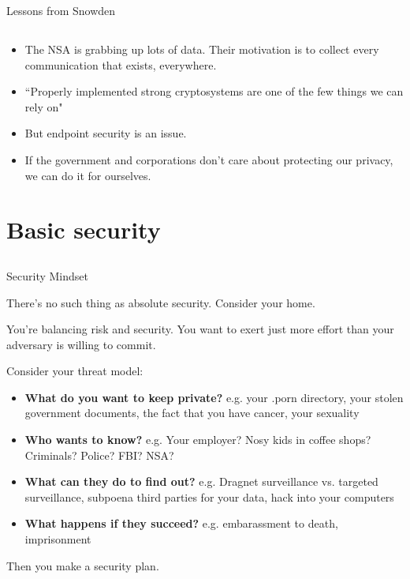 \documentclass{beamer}
\begin{document}
\begin{frame}{Lessons from Snowden}
\subsection{}

\begin{itemize}
   \item<1->{The NSA is grabbing up lots of data. Their motivation is to collect every communication that exists, everywhere. }
   \item<2->{``Properly implemented strong cryptosystems are one of the few things we can rely on"}
   \item<3->{But endpoint security is an issue.}
   \item<4->{If the government and corporations don't care about protecting our privacy, we can do it for ourselves.}  
\end{itemize}
\end{frame}

\section{Basic security}
\subsection{}

\begin{frame}{Security Mindset}

There's no such thing as absolute security. Consider your home. 

\bigskip

You're balancing risk and security. You want to exert just more effort than your adversary is willing to commit.

\bigskip

Consider your threat model:
\begin{itemize}
\item \textbf{What do you want to keep private?} e.g. your .porn directory, your stolen government documents, the fact that you have cancer, your sexuality
\item \textbf{Who wants to know?} e.g. Your employer? Nosy kids in coffee shops? Criminals? Police? FBI? NSA?
\item \textbf{What can they do to find out?} e.g. Dragnet surveillance vs.
targeted surveillance, subpoena third parties for your data, hack into
your computers
\item \textbf{What happens if they succeed?} e.g. embarassment to death, imprisonment
\end{itemize}

\bigskip

Then you make a security plan.
\bigskip

\end{frame}
\end{document}
